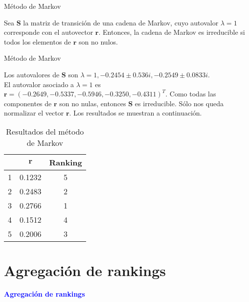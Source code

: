 \documentclass[10pt]{beamer}
\begin{document}
	\begin{frame}{Método de Markov}
	\begin{prop}
		Sea $\mathbf{S}$ la matriz de transición de una cadena de Markov, cuyo autovalor $\lambda = 1$ corresponde con el autovector $\mathbf{r}$. Entonces, la cadena de Markov es irreducible si todos los elementos de $\mathbf{r}$ son no nulos.
	\end{prop}
	\end{frame}
	
	\begin{frame}{Método de Markov}
		\begin{ejemplo}[continuación]
		Los autovalores de $\mathbf{S}$ son $\lambda = 1, -0.2454 \pm 0.536i, -0.2549 \pm 0.0833i$.\\
		El autovalor asociado a $\lambda = 1$ es $\mathbf{r} = (-0.2649, -0.5337, -0.5946, -0.3250, -0.4311)^T$. Como todas las componentes de $\mathbf{r}$ son no nulas, entonces $\mathbf{S}$ es irreducible. Sólo nos queda normalizar el vector $\mathbf{r}$. Los resultados se muestran a continuación. 
		
		\begin{table}[h]
			\centering
			\caption{Resultados del método de Markov}
			\label{tbl:markov_resultados}
			\begin{tabular}{@{}ccc@{}}
				\cmidrule(l){2-3}
				& $\mathbf{r}$ & Ranking \\ \midrule
				1 & 0.1232       & 5       \\
				2 & 0.2483       & 2       \\
				3 & 0.2766       & 1       \\
				4 & 0.1512       & 4       \\
				5 & 0.2006       & 3       \\ \bottomrule
			\end{tabular}
		\end{table}
		\end{ejemplo}
	\end{frame}
	
	\section{Agregación de rankings}
	
	\begin{frame}
		\begin{center}
			\Huge\textbf{\textsf{\textcolor{blue}{Agregación de rankings}}}
		\end{center}
	\end{frame}
	
\end{document}
